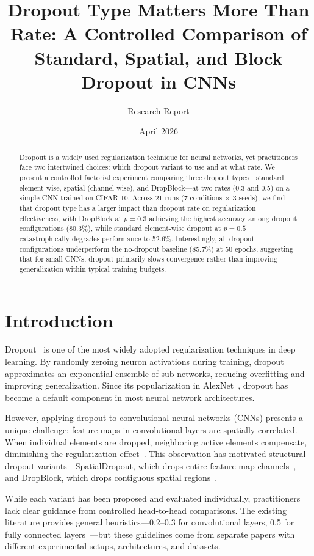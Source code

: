 \documentclass[11pt]{article}
\title{Dropout Type Matters More Than Rate: A Controlled Comparison of Standard, Spatial, and Block Dropout in CNNs}
\author{Research Report}
\date{April 2026}
\begin{document}
\maketitle

\begin{abstract}
Dropout is a widely used regularization technique for neural networks, yet practitioners face two intertwined choices: which dropout variant to use and at what rate. We present a controlled factorial experiment comparing three dropout types---standard element-wise, spatial (channel-wise), and DropBlock---at two rates (0.3 and 0.5) on a simple CNN trained on CIFAR-10. Across 21 runs (7 conditions $\times$ 3 seeds), we find that dropout type has a larger impact than dropout rate on regularization effectiveness, with DropBlock at $p{=}0.3$ achieving the highest accuracy among dropout configurations (80.3\%), while standard element-wise dropout at $p{=}0.5$ catastrophically degrades performance to 52.6\%. Interestingly, all dropout configurations underperform the no-dropout baseline (85.7\%) at 50 epochs, suggesting that for small CNNs, dropout primarily slows convergence rather than improving generalization within typical training budgets.
\end{abstract}

\section{Introduction}

Dropout~\citep{srivastava2014} is one of the most widely adopted regularization techniques in deep learning. By randomly zeroing neuron activations during training, dropout approximates an exponential ensemble of sub-networks, reducing overfitting and improving generalization. Since its popularization in AlexNet~\citep{krizhevsky2012}, dropout has become a default component in most neural network architectures.

However, applying dropout to convolutional neural networks (CNNs) presents a unique challenge: feature maps in convolutional layers are spatially correlated. When individual elements are dropped, neighboring active elements compensate, diminishing the regularization effect~\citep{tompson2015, ghiasi2018}. This observation has motivated structural dropout variants---SpatialDropout, which drops entire feature map channels~\citep{tompson2015}, and DropBlock, which drops contiguous spatial regions~\citep{ghiasi2018}.

While each variant has been proposed and evaluated individually, practitioners lack clear guidance from controlled head-to-head comparisons. The existing literature provides general heuristics---0.2--0.3 for convolutional layers, 0.5 for fully connected layers~\citep{dropoutreview2023}---but these guidelines come from separate papers with different experimental setups, architectures, and datasets.
\end{document}
